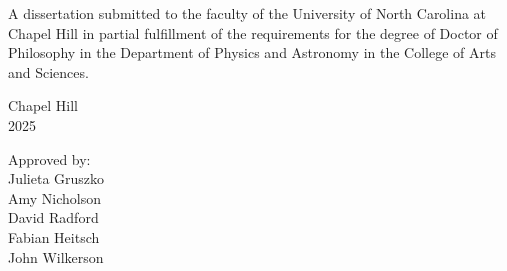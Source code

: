 \begin{titlepage}
\begin{center}


\begin{singlespace}
\bf
\MakeUppercase{{\thesistitle}}
\end{singlespace}

\vspace{61pt}
\large {\khb}
\end{center}



\vspace{40pt}
\begin{center}
\begin{singlespace}
\noindent \large
A dissertation submitted to the faculty of the University of North Carolina at Chapel Hill in partial fulfillment of the requirements for the degree of Doctor of Philosophy in the Department of Physics and Astronomy in the College of Arts and Sciences.
\end{singlespace}
\end{center}


\vspace{40pt}
\begin{center}
\begin{singlespace} \large
Chapel Hill \\
2025
\end{singlespace}
\end{center}


\vspace{40pt}
\begin{flushright}
\begin{minipage}[t]{1.5in} \large
Approved by:\\
Julieta Gruszko \\
Amy Nicholson \\
David Radford \\
Fabian Heitsch \\
John Wilkerson
\end{minipage}
\end{flushright}

\end{titlepage}
